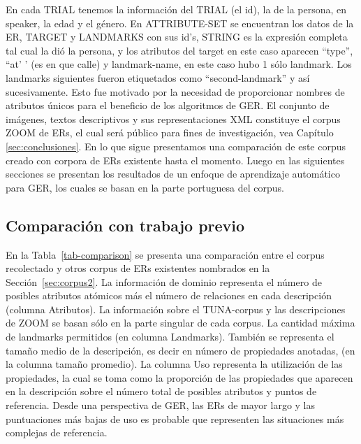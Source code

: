 
En cada TRIAL tenemos la informaci\'on del TRIAL (el id), la de la persona, en speaker, la edad y el g\'enero. En ATTRIBUTE-SET se encuentran los datos de la ER, TARGET y LANDMARKS con sus id's, STRING es la expresi\'on completa tal cual la di\'o la persona, y los atributos del target en este caso aparecen ``type'', ``at' ' (es en que calle) y landmark-name, en este caso hubo 1 s\'olo landmark. Los landmarks siguientes fueron etiquetados como ``second-landmark'' y as\'{i} sucesivamente. Esto fue motivado por la necesidad de proporcionar nombres de atributos \'unicos para el beneficio de los algoritmos de GER.
El conjunto de im\'agenes, textos descriptivos y sus representaciones XML constituye el corpus ZOOM de ERs, el cual ser\'a p\'ublico para fines de investigaci\'on, vea Cap\'itulo \ref{sec:conclusiones}.  En lo que sigue presentamos una comparaci\'on de este corpus creado con corpora de ERs existente hasta el momento. Luego en las siguientes secciones se presentan los resultados de un enfoque de aprendizaje autom\'atico para GER, los cuales se basan en la parte portuguesa del corpus.

\subsection{Comparaci\'on con trabajo previo}
\label{sec:comparacion_trabajo_previo}

En la Tabla~\ref{tab-comparison} se presenta una comparaci\'on entre el corpus recolectado y otros corpus de ERs existentes nombrados en la Secci\'on~\ref{sec:corpus2}. La informaci\'on de dominio representa el n\'umero de posibles atributos at\'omicos m\'as el n\'umero de relaciones en cada descripci\'on (columna Atributos). La informaci\'on sobre el TUNA-corpus y las descripciones de ZOOM se basan s\'olo en la parte singular de cada corpus. La cantidad m\'axima de landmarks permitidos (en columna Landmarks). Tambi\'en se representa el tama\~no medio de la descripci\'on, es decir en n\'umero de propiedades anotadas, (en la columna tama\~no promedio). La columna Uso representa la utilizaci\'on de las propiedades, la cual se toma como la proporci\'on de las propiedades que aparecen en la descripci\'on sobre el n\'umero total de posibles atributos y puntos de referencia. Desde una perspectiva de GER, las ERs de mayor largo y las puntuaciones m\'as bajas de uso es probable que representen las situaciones m\'as complejas de referencia.


